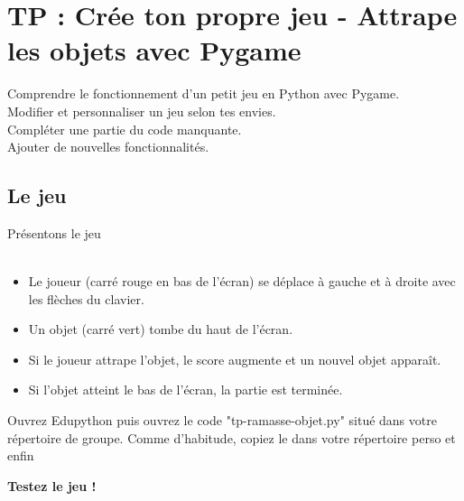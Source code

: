 \chapter*{TP : Crée ton propre jeu - Attrape les objets avec Pygame}

\begin{center}

\begin{minipage}{0.8\textwidth}
\begin{Objectif}
  \begin{center}
    Comprendre le fonctionnement d’un petit jeu en Python avec Pygame.\\
    Modifier et personnaliser un jeu selon tes envies.\\
    Compléter une partie du code manquante.\\
    Ajouter de nouvelles fonctionnalités.\\
\end{center}
\end{Objectif}
\end{minipage}
\end{center}



\section*{Le jeu}
Présentons le jeu\\
    \hspace{5pt}
    \hspace{5pt}
    \\
    \begin{itemize}
    \item[$\bullet$] Le joueur (carré rouge en bas de l’écran) se déplace à gauche et à droite avec les flèches du clavier.
    \item[$\bullet$] Un objet (carré vert) tombe du haut de l’écran.
    \item[$\bullet$] Si le joueur attrape l’objet, le score augmente et un nouvel objet apparaît.
    \item[$\bullet$] Si l’objet atteint le bas de l’écran, la partie est terminée.
\end{itemize}

\begin{Avous}
    Ouvrez Edupython puis ouvrez le code "tp-ramasse-objet.py" situé dans votre répertoire de groupe. Comme d'habitude, copiez le dans votre répertoire perso et enfin
    \begin{center}
    \large{\textbf{Testez le jeu !}}
    \end{center}

\end{Avous}
\newpage
